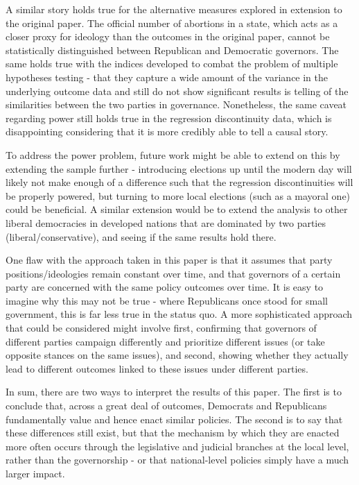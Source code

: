 \documentclass{article}
\begin{document}
A similar story holds true for the alternative measures explored in extension to the original paper. The official number of abortions in a state, which acts as a closer proxy for ideology than the outcomes in the original paper, cannot be statistically distinguished between Republican and Democratic governors. The same holds true with the indices developed to combat the problem of multiple hypotheses testing - that they capture a wide amount of the variance in the underlying outcome data and still do not show significant results is telling of the similarities between the two parties in governance. Nonetheless, the same caveat regarding power still holds true in the regression discontinuity data, which is disappointing considering that it is more credibly able to tell a causal story.

To address the power problem, future work might be able to extend on this by extending the sample further - introducing elections up until the modern day will likely not make enough of a difference such that the regression discontinuities will be properly powered, but turning to more local elections (such as a mayoral one) could be beneficial. A similar extension would be to extend the analysis to other liberal democracies in developed nations that are dominated by two parties (liberal/conservative), and seeing if the same results hold there.

One flaw with the approach taken in this paper is that it assumes that party positions/ideologies remain constant over time, and that governors of a certain party are concerned with the same policy outcomes over time. It is easy to imagine why this may not be true - where Republicans once stood for small government, this is far less true in the status quo. A more sophisticated approach that could be considered might involve first, confirming that governors of different parties campaign differently and prioritize different issues (or take opposite stances on the same issues), and second, showing whether they actually lead to different outcomes linked to these issues under different parties.

In sum, there are two ways to interpret the results of this paper. The first is to conclude that, across a great deal of outcomes, Democrats and Republicans fundamentally value and hence enact similar policies. The second is to say that these differences still exist, but that the mechanism by which they are enacted more often occurs through the legislative and judicial branches at the local level, rather than the governorship - or that national-level policies simply have a much larger impact. 
\end{document}
